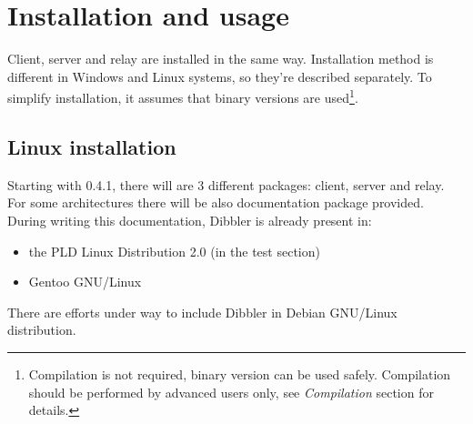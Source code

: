 
\section{Installation and usage}
Client, server and relay are installed in the same way. Installation
method is different in Windows and Linux systems, so they're described
separately. To simplify installation, it assumes that binary versions
are used\footnote{Compilation is not required, binary version can be
  used safely. Compilation should be performed by
  advanced users only, see \emph{Compilation} section for details.}.

\subsection{Linux installation}
Starting with 0.4.1, there will are 3 different packages: client,
server and relay. For some architectures there will be also
documentation package provided. During writing this documentation,
Dibbler is already present in:
\begin{itemize}
\item the PLD Linux Distribution 2.0 (in the test section)
\item Gentoo GNU/Linux
\end{itemize}
There are efforts under way to include Dibbler in Debian GNU/Linux distribution.


